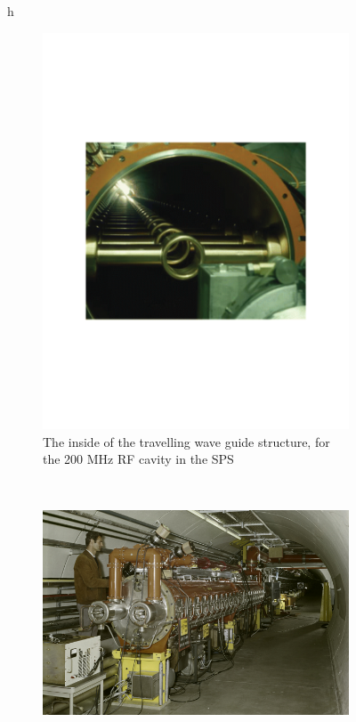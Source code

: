 \begin{figure}{h}
      ~ %
      \begin{subfigure}[h]{0.45\textwidth}
        \includegraphics[width=\textwidth]{Figures/LHC_Diagrams/LHC__SPS__RFCavity_InsideView.pdf}
        \caption{The inside of the travelling wave guide structure,
          for the 200 MHz RF cavity in the SPS}\label{fig:sps_rf_inside}
      \end{subfigure}
       ~ %
      \begin{subfigure}[h]{0.45\textwidth}
        \includegraphics[width=\textwidth]{Figures/LHC_Diagrams/LHC__SPS__RFCavity_OutsideView.jpg}

\end{subfigure}
\end{figure}
